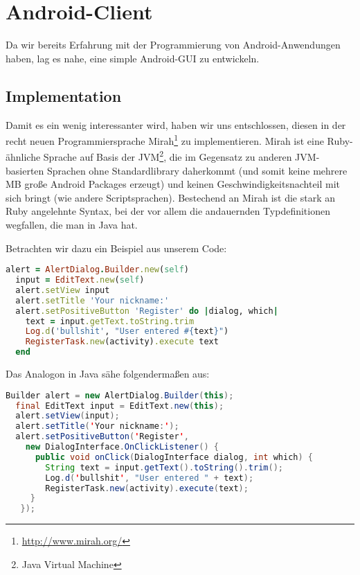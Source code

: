 \documentclass[12pt, a4paper]{scrartcl}
\begin{document}

\clearpage

\section{Android-Client}

Da wir bereits Erfahrung mit der Programmierung von Android-Anwendungen haben,
lag es nahe, eine simple Android-GUI zu entwickeln.

\subsection{Implementation}

Damit es ein wenig interessanter wird, haben wir uns entschlossen, diesen in
der recht neuen Programmiersprache Mirah\footnote{\url{http://www.mirah.org/}}
zu implementieren. Mirah ist eine Ruby-ähnliche Sprache auf Basis der
JVM\footnote{Java Virtual Machine}, die im Gegensatz zu anderen JVM-basierten
Sprachen ohne Standardlibrary daherkommt (und somit keine mehrere MB große
Android Packages erzeugt) und keinen Geschwindigkeitsnachteil mit sich bringt
(wie andere Scriptsprachen). Bestechend an Mirah ist die stark an Ruby
angelehnte Syntax, bei der vor allem die andauernden Typdefinitionen wegfallen,
die man in Java hat.
\np

Betrachten wir dazu ein Beispiel aus unserem Code:
\begin{lstlisting}[language=Ruby]
  alert = AlertDialog.Builder.new(self)
  input = EditText.new(self)
  alert.setView input
  alert.setTitle 'Your nickname:'
  alert.setPositiveButton 'Register' do |dialog, which|
    text = input.getText.toString.trim
    Log.d('bullshit', "User entered #{text}")
    RegisterTask.new(activity).execute text
  end
\end{lstlisting}

Das Analogon in Java sähe folgendermaßen aus:
\begin{lstlisting}[language=Java]
  Builder alert = new AlertDialog.Builder(this);
  final EditText input = EditText.new(this);
  alert.setView(input);
  alert.setTitle('Your nickname:');
  alert.setPositiveButton('Register',
    new DialogInterface.OnClickListener() {
      public void onClick(DialogInterface dialog, int which) {
        String text = input.getText().toString().trim();
        Log.d('bullshit', "User entered " + text);
        RegisterTask.new(activity).execute(text);
     }
   });
\end{lstlisting}
\end{document}
